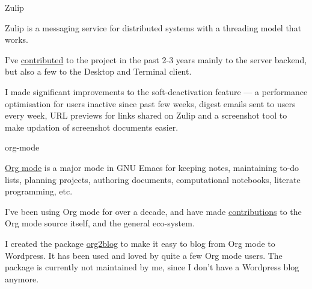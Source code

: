 
\begin{cventries}

  \cventry
      {Zulip}
      {}
      {} %
      {} %
      {
        \begin{cvitems} %
        \item {Zulip is a messaging service for distributed systems with a threading model that works.}
        \item {I've \href{https://github.com/zulip/zulip/commits?author=punchagan}{contributed} to the project in the past 2-3 years mainly to the server backend, but also a few to the Desktop and Terminal client.}
        \item {I made significant improvements to the soft-deactivation feature --- a performance optimisation for users inactive since past few weeks, digest emails sent to users every week, URL previews for links shared on Zulip and a screenshot tool to make updation of screenshot documents easier.}
        \end{cvitems}
      }
  \cventry
      {org-mode}
      {}
      {} %
      {} %
      {
        \begin{cvitems} %
        \item {\href{https://orgmode.org/}{Org mode} is a major mode in GNU Emacs for keeping notes, maintaining to-do lists, planning projects, authoring documents, computational notebooks, literate programming, etc.}
        \item I've been using Org mode for over a decade, and have made \href{https://github.com/bzg/org-mode/commits?author=punchagan}{contributions} to the Org mode source itself, and the general eco-system.
        \item I created the package \href{https://github.com/org2blog/org2blog/commits?author=punchagan}{org2blog} to make it easy to blog from  Org mode to Wordpress. It has been used and loved by quite a few Org mode users. The package is currently not maintained by me, since I don't have a Wordpress blog anymore.

\end{cvitems}}
\end{cventries}
